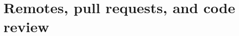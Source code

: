\chapter{Remotes, pull requests, and code review}
\label{ch:remotes-pull-requests-and-code-review}

